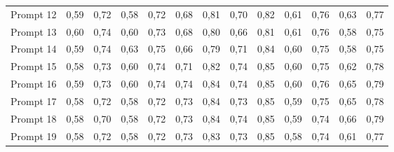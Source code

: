 \begin{tabular}{lrrrrrrrrrrrr}
Prompt 12         & 0,59                  & 0,72                    & 0,58                  & 0,72                    & 0,68                  & 0,81                    & 0,70                  & 0,82                    & 0,61                  & 0,76                    & 0,63                  & 0,77                    \\
Prompt 13         & 0,60                  & 0,74                    & 0,60                  & 0,73                    & 0,68                  & 0,80                    & 0,66                  & 0,81                    & 0,61                  & 0,76                    & 0,58                  & 0,75                    \\
Prompt 14         & 0,59                  & 0,74                    & 0,63                  & 0,75                    & 0,66                  & 0,79                    & 0,71                  & 0,84                    & 0,60                  & 0,75                    & 0,58                  & 0,75                    \\
Prompt 15         & 0,58                  & 0,73                    & 0,60                  & 0,74                    & 0,71                  & 0,82                    & 0,74                  & 0,85                    & 0,60                  & 0,75                    & 0,62                  & 0,78                    \\
Prompt 16         & 0,59                  & 0,73                    & 0,60                  & 0,74                    & 0,74                  & 0,84                    & 0,74                  & 0,85                    & 0,60                  & 0,76                    & 0,65                  & 0,79                    \\
Prompt 17         & 0,58                  & 0,72                    & 0,58                  & 0,72                    & 0,73                  & 0,84                    & 0,73                  & 0,85                    & 0,59                  & 0,75                    & 0,65                  & 0,78                    \\
Prompt 18         & 0,58                  & 0,70                    & 0,58                  & 0,72                    & 0,73                  & 0,84                    & 0,74                  & 0,85                    & 0,59                  & 0,74                    & 0,66                  & 0,79                    \\
Prompt 19         & 0,58                  & 0,72                    & 0,58                  & 0,72                    & 0,73                  & 0,83                    & 0,73                  & 0,85                    & 0,58                  & 0,74                    & 0,61                  & 0,77                    \\

\end{tabular}
